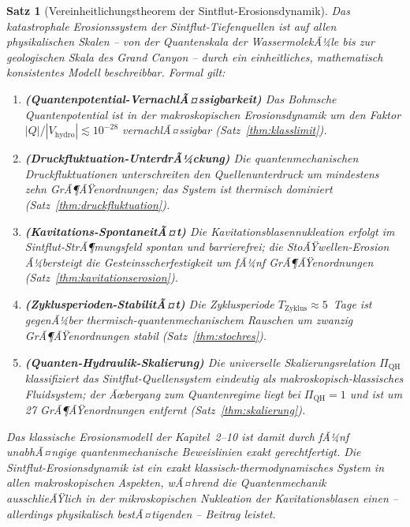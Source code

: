 ﻿\documentclass[12pt,a4paper]{report}
\newtheorem{theorem}{Satz}[chapter]
\begin{document}
\begin{theorem}[Vereinheitlichungstheorem der Sintflut-Erosionsdynamik]
	\label{thm:vereinheitlichung}
	Das katastrophale Erosionssystem der Sintflut-Tiefenquellen ist auf allen physikalischen Skalen -- von der Quantenskala der WassermolekÃ¼le bis zur geologischen Skala des Grand Canyon -- durch ein einheitliches, mathematisch konsistentes Modell beschreibbar. Formal gilt:
	
	\begin{enumerate}
		\item \textbf{(Quantenpotential-VernachlÃ¤ssigbarkeit)} Das Bohmsche Quantenpotential ist in der makroskopischen Erosionsdynamik um den Faktor $|Q|/|V_\mathrm{hydro}| \lesssim 10^{-28}$ vernachlÃ¤ssigbar (Satz~\ref{thm:klasslimit}).
		
		\item \textbf{(Druckfluktuation-UnterdrÃ¼ckung)} Die quantenmechanischen Druckfluktuationen unterschreiten den Quellenunterdruck um mindestens zehn GrÃ¶ÃŸenordnungen; das System ist thermisch dominiert (Satz~\ref{thm:druckfluktuation}).
		
		\item \textbf{(Kavitations-SpontaneitÃ¤t)} Die Kavitationsblasennukleation erfolgt im Sintflut-StrÃ¶mungsfeld spontan und barrierefrei; die StoÃŸwellen-Erosion Ã¼bersteigt die Gesteinsscherfestigkeit um fÃ¼nf GrÃ¶ÃŸenordnungen (Satz~\ref{thm:kavitationserosion}).
		
		\item \textbf{(Zyklusperioden-StabilitÃ¤t)} Die Zyklusperiode $T_\mathrm{Zyklus} \approx 5$~Tage ist gegenÃ¼ber thermisch-quantenmechanischem Rauschen um zwanzig GrÃ¶ÃŸenordnungen stabil (Satz~\ref{thm:stochres}).
		
		\item \textbf{(Quanten-Hydraulik-Skalierung)} Die universelle Skalierungsrelation $\Pi_\mathrm{QH}$ klassifiziert das Sintflut-Quellensystem eindeutig als makroskopisch-klassisches Fluidsystem; der Ãœbergang zum Quantenregime liegt bei $\Pi_\mathrm{QH} = 1$ und ist um 27 GrÃ¶ÃŸenord\-nungen entfernt (Satz~\ref{thm:skalierung}).
	\end{enumerate}
	
	Das klassische Erosionsmodell der Kapitel~2--10 ist damit durch fÃ¼nf unabhÃ¤ngige quantenmechanische Beweislinien exakt gerechtfertigt. Die Sintflut-Erosionsdynamik ist ein exakt klassisch-thermodynamisches System in allen makroskopischen Aspekten, wÃ¤hrend die Quantenmechanik ausschlieÃŸlich in der mikroskopischen Nukleation der Kavitationsblasen einen -- allerdings physikalisch bestÃ¤tigenden -- Beitrag leistet.
\end{theorem}
\end{document}
